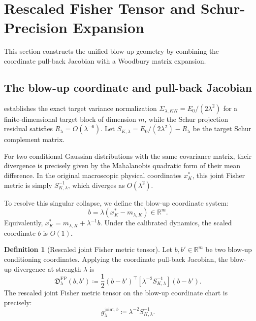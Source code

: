 \documentclass[11pt]{amsart}
\theoremstyle{plain}
\theoremstyle{definition}
\newtheorem{definition}[theorem]{Definition}
\theoremstyle{remark}
\begin{document}
\section{Rescaled Fisher Tensor and Schur-Precision Expansion}
\label{sec:fisher_geometry}

This section constructs the unified blow-up geometry by combining the coordinate pull-back Jacobian with a Woodbury matrix expansion.

\subsection{The blow-up coordinate and pull-back Jacobian}

 establishes the exact target variance normalization $\Sigma_{\lambda,KK} = E_0/(2\lambda^2)$ for a finite-dimensional target block of dimension $m$, while the Schur projection residual satisfies $R_\lambda = O(\lambda^{-6})$. Let $S_{K,\lambda} = E_0/(2\lambda^2) - R_\lambda$ be the target Schur complement matrix.

For two conditional Gaussian distributions with the same covariance matrix, their divergence is precisely given by the Mahalanobis quadratic form of their mean difference. In the original macroscopic physical coordinates $x_K^*$, this joint Fisher metric is simply $S_{K,\lambda}^{-1}$, which diverges as $O(\lambda^2)$.

To resolve this singular collapse, we define the blow-up coordinate system:
\begin{equation}
  b = \lambda(x_K^* - m_{\lambda,K}) \in \mathbb{R}^m.
\end{equation}
Equivalently, $x_K^* = m_{\lambda,K} + \lambda^{-1}b$. Under the calibrated dynamics, the scaled coordinate $b$ is $O(1)$. 

\begin{definition}[Rescaled joint Fisher metric tensor]
\label{def:fp_divergence}
Let $b,b'\in\mathbb{R}^m$ be two blow-up conditioning coordinates. Applying the coordinate pull-back Jacobian, the blow-up divergence at strength $\lambda$ is
\begin{equation}
  \mathfrak{D}_\lambda^{\mathrm{FP}}(b,b')
  \coloneqq
  \frac12 (b-b')^\top \left[ \lambda^{-2} S_{K,\lambda}^{-1} \right] (b-b').
\end{equation}
The rescaled joint Fisher metric tensor on the blow-up coordinate chart is precisely:
\begin{equation}
  g_{\lambda}^{\mathrm{joint},b} \coloneqq \lambda^{-2} S_{K,\lambda}^{-1}.
\end{equation}
\end{definition}
\end{document}
